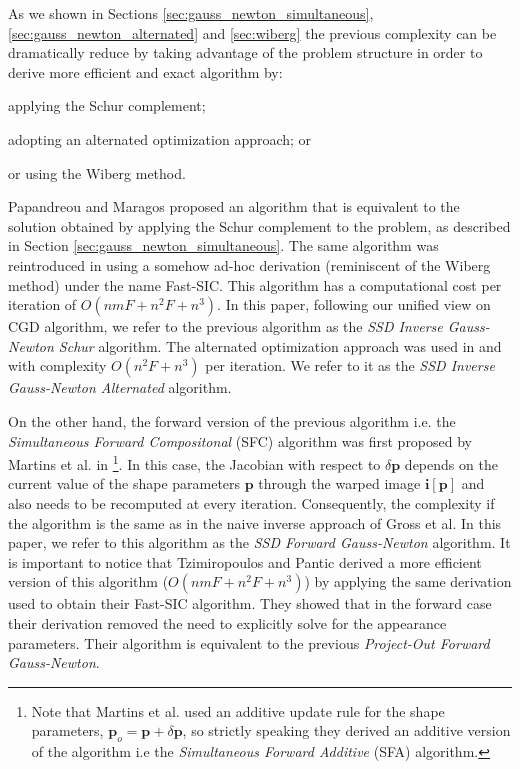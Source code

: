 As we shown in Sections \ref{sec:gauss_newton_simultaneous}, \ref{sec:gauss_newton_alternated} and \ref{sec:wiberg} the previous complexity can be dramatically reduce by taking advantage of the problem structure in order to derive more efficient and exact algorithm by:
\begin{inparaenum}
\item applying the Schur complement;
\item adopting an alternated optimization approach; or
\item or using the Wiberg method.
\end{inparaenum}
Papandreou and Maragos \cite{Papandreou2008} proposed an algorithm that is equivalent to the solution obtained by applying the Schur complement to the problem, as described in Section \ref{sec:gauss_newton_simultaneous}. The same algorithm was reintroduced in \cite{Tzimiropoulos2013} using a somehow ad-hoc derivation (reminiscent of the Wiberg method) under the name Fast-SIC. This algorithm has a computational cost per iteration of $O(nmF + n^2F + n^3)$. In this paper, following our unified view on CGD algorithm, we refer to the previous algorithm as the \emph{SSD Inverse Gauss-Newton Schur} algorithm. The alternated optimization approach was used in \cite{Tzimiropoulos2012} and \cite{Antonakos2014} with complexity $O(n^2F + n^3)$ per iteration. We refer to it as the \emph{SSD Inverse Gauss-Newton Alternated} algorithm.

On the other hand, the forward version of the previous algorithm i.e. the \emph{Simultaneous Forward Compositonal} (SFC) algorithm was first proposed by Martins et al. in \cite{Martins2010}\footnote{Note that Martins et al.  used an additive update rule for the shape parameters, $\mathbf{p}_o =  \mathbf{p} + \delta\mathbf{p}$, so strictly speaking they derived an additive version of the algorithm i.e the \emph{Simultaneous Forward Additive} (SFA) algorithm.}. In this case, the Jacobian with respect to $\delta\mathbf{p}$ depends on the current value of the shape parameters $\mathbf{p}$ through the warped image $\mathbf{i}[\mathbf{p}]$ and also needs to be recomputed at every iteration. Consequently, the complexity if the algorithm is the same as in the naive inverse approach of Gross et al. In this paper, we refer to this algorithm as the \emph{SSD Forward Gauss-Newton} algorithm. It is important to notice that Tzimiropoulos and Pantic \cite{Tzimiropoulos2013} derived a more efficient version of this algorithm ($O(nmF + n^2F + n^3)$) by applying the same derivation used to obtain their Fast-SIC algorithm. They showed that in the forward case their derivation removed the need to explicitly solve for the appearance parameters. Their algorithm is equivalent to the previous \emph{Project-Out Forward Gauss-Newton}.

